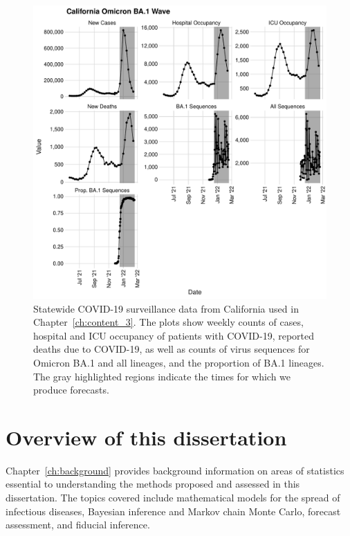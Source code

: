 \begin{figure}
    \centering
    \includegraphics[width=1.0\columnwidth]{figures/ch_5/california_binned_data_plot.pdf}
    \caption[Statewide COVID-19 surveillance data from California used in Chapter~\ref{ch:content_3}.]{
Statewide COVID-19 surveillance data from California used in Chapter~\ref{ch:content_3}.
The plots show weekly counts of cases, hospital and ICU occupancy of patients with COVID-19, reported deaths due to COVID-19, as well as counts of virus sequences for Omicron BA.1 and all lineages, and the proportion of BA.1 lineages.
The gray highlighted regions indicate the times for which we produce forecasts.}
    \label{ch_1:fig:california_binned_data_plot}
\end{figure}

\section{Overview of this dissertation}
Chapter~\ref{ch:background} provides background information on areas of statistics essential to understanding the methods proposed and assessed in this dissertation.
The topics covered include mathematical models for the spread of infectious diseases, Bayesian inference and Markov chain Monte Carlo, forecast assessment, and fiducial inference.


